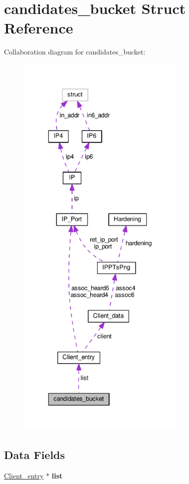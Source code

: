 \hypertarget{structcandidates__bucket}{\section{candidates\+\_\+bucket Struct Reference}
\label{structcandidates__bucket}
}


Collaboration diagram for candidates\+\_\+bucket\+:
\nopagebreak
\begin{figure}[H]
\begin{center}
\leavevmode
\includegraphics[height=550pt]{structcandidates__bucket__coll__graph}
\end{center}
\end{figure}
\subsection*{Data Fields}
\begin{DoxyCompactItemize}
\item 
\hypertarget{structcandidates__bucket_a515f2b5e53003e623b334ab90c4280e0}{\hyperlink{struct_client__entry}{Client\+\_\+entry} $\ast$ {\bfseries list}}\label{structcandidates__bucket_a515f2b5e53003e623b334ab90c4280e0}

\end{DoxyCompactItemize}



